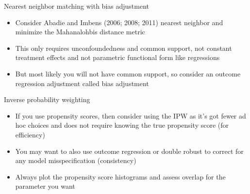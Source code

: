 \documentclass{beamer}
\begin{document}
\begin{frame}{Nearest neighbor matching with bias adjustment}

\begin{itemize}
\item Consider Abadie and Imbens (2006; 2008; 2011) nearest neighbor and minimize the Mahanalohbis distance metric
\item This only requires unconfoundedness and common support, not constant treatment effects and not parametric functional form like regressions 
\item But most likely you will not have common support, so consider an outcome regression adjustment called bias adjustment

\end{itemize}

\end{frame}

\begin{frame}{Inverse probability weighting}

\begin{itemize}
\item If you use propensity scores, then consider using the IPW as it's got fewer ad hoc choices and does not require knowing the true propensity score (for efficiency)
\item You may want to also use outcome regression or double robust to correct for any model misspecification (consistency)
\item Always plot the propensity score histograms and assess overlap for the parameter you want
\end{itemize}

\end{frame}
\end{document}
